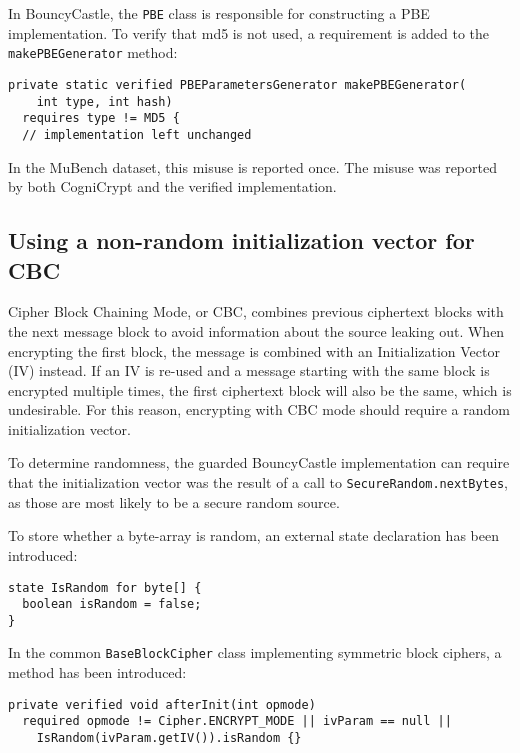 \documentclass{article}
\begin{document}
In BouncyCastle, the \texttt{PBE} class is responsible for constructing a PBE implementation.
To verify that md5 is not used, a requirement is added to the \texttt{makePBEGenerator} method:

\begin{lstlisting}[style=jGuard]
private static verified PBEParametersGenerator makePBEGenerator(
    int type, int hash)
  requires type != MD5 {
  // implementation left unchanged
\end{lstlisting}

In the MuBench dataset, this misuse is reported once.
The misuse was reported by both CogniCrypt and the verified implementation.

\subsection{Using a non-random initialization vector for CBC}\label{sec:NonRandomIV}

Cipher Block Chaining Mode, or CBC, combines previous ciphertext blocks with the next message block to avoid
information about the source leaking out.
When encrypting the first block, the message is combined with an Initialization Vector (IV) instead.
If an IV is re-used and a message starting with the same block is encrypted multiple times, the first
ciphertext block will also be the same, which is undesirable.
For this reason, encrypting with CBC mode should require a random initialization vector.

To determine randomness, the guarded BouncyCastle implementation can require that the initialization vector
was the result of a call to \texttt{SecureRandom.nextBytes}, as those are most likely to be a secure random source.

To store whether a byte-array is random, an external state declaration has been introduced:

\begin{lstlisting}[style=jGuard]
state IsRandom for byte[] {
  boolean isRandom = false;
}
\end{lstlisting}

In the common \texttt{BaseBlockCipher} class implementing symmetric block ciphers, a method
has been introduced:

\begin{lstlisting}[style=jGuard]
private verified void afterInit(int opmode)
  required opmode != Cipher.ENCRYPT_MODE || ivParam == null ||
    IsRandom(ivParam.getIV()).isRandom {}
\end{lstlisting}
\end{document}
